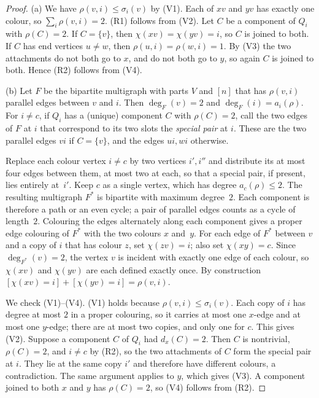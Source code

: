 \documentclass[11pt]{amsart}
\theoremstyle{definition}
\theoremstyle{remark}
\begin{document}
\begin{proof}
(a) We have $\rho(v,i)\le\sigma_i(v)$ by (V1). Each of $xv$ and $yv$ has exactly one colour,
so $\sum_i\rho(v,i)=2$. (R1) follows from (V2). Let $C$ be a component of $Q_i$ with
$\rho(C)=2$. If $C=\{v\}$, then $\chi(xv)=\chi(yv)=i$, so $C$ is joined to both. If $C$ has end
vertices $u\ne w$, then $\rho(u,i)=\rho(w,i)=1$. By (V3) the two attachments do not both go to
$x$, and do not both go to $y$, so again $C$ is joined to both. Hence (R2) follows from (V4).

(b) Let $F$ be the bipartite multigraph with parts $V$ and $[n]$ that has $\rho(v,i)$
parallel edges between $v$ and $i$. Then $\deg_F(v)=2$ and $\deg_F(i)=a_i(\rho)$. For $i\ne c$,
if $Q_i$ has a (unique) component $C$ with $\rho(C)=2$, call the two edges of $F$ at $i$ that
correspond to its two slots the \emph{special pair} at $i$. These are the two parallel edges
$vi$ if $C=\{v\}$, and the edges $ui,wi$ otherwise.

Replace each colour vertex $i\ne c$ by two vertices $i',i''$ and distribute its at most four
edges between them, at most two at each, so that a special pair, if present, lies entirely
at~$i'$. Keep $c$ as a single vertex, which has degree $a_c(\rho)\le2$. The resulting multigraph
$F^\ast$ is bipartite with maximum degree~$2$. Each component is therefore a path or an even
cycle; a pair of parallel edges counts as a cycle of length~$2$. Colouring the edges alternately
along each component gives a proper edge colouring of $F^\ast$ with the two colours $x$
and~$y$. For each edge of $F^\ast$ between $v$ and a copy of $i$ that has colour $z$, set
$\chi(zv)=i$; also set $\chi(xy)=c$. Since $\deg_{F^\ast}(v)=2$, the vertex $v$ is incident with
exactly one edge of each colour, so $\chi(xv)$ and $\chi(yv)$ are each defined exactly once.
By construction $[\chi(xv)=i]+[\chi(yv)=i]=\rho(v,i)$.

We check (V1)--(V4). (V1) holds because $\rho(v,i)\le\sigma_i(v)$. Each copy of $i$ has degree at
most $2$ in a proper colouring, so it carries at most one $x$-edge and at most one $y$-edge;
there are at most two copies, and only one for $c$. This gives (V2). Suppose a component $C$ of
$Q_i$ had $d_x(C)=2$. Then $C$ is nontrivial, $\rho(C)=2$, and $i\ne c$ by (R2), so the two
attachments of $C$ form the special pair at $i$. They lie at the same copy $i'$ and therefore
have different colours, a contradiction. The same argument applies to $y$, which gives (V3).
A component joined to both $x$ and $y$ has $\rho(C)=2$, so (V4) follows from (R2).
\end{proof}
\end{document}
